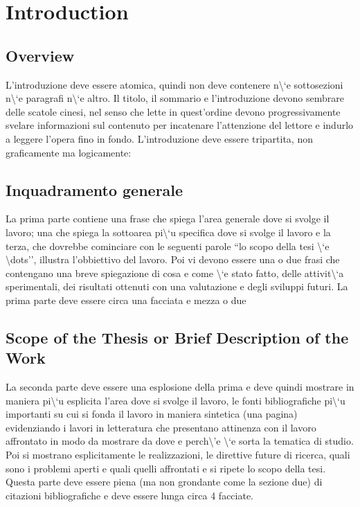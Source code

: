 
\chapter{Introduction}


\section{Overview}

L'introduzione deve essere atomica, quindi non deve contenere n\textbackslash{}`e
sottosezioni n\textbackslash{}`e paragrafi n\textbackslash{}`e altro.
Il titolo, il sommario e l'introduzione devono sembrare delle scatole
cinesi, nel senso che lette in quest'ordine devono progressivamente
svelare informazioni sul contenuto per incatenare l'attenzione del
lettore e indurlo a leggere l'opera fino in fondo. L'introduzione
deve essere tripartita, non graficamente ma logicamente:


\section{Inquadramento generale}

La prima parte contiene una frase che spiega l'area generale dove
si svolge il lavoro; una che spiega la sottoarea pi\textbackslash{}`u
specifica dove si svolge il lavoro e la terza, che dovrebbe cominciare
con le seguenti parole ``lo scopo della tesi \textbackslash{}`e \textbackslash{}dots'',
illustra l'obbiettivo del lavoro. Poi vi devono essere una o due frasi
che contengano una breve spiegazione di cosa e come \textbackslash{}`e
stato fatto, delle attivit\textbackslash{}`a sperimentali, dei risultati
ottenuti con una valutazione e degli sviluppi futuri. La prima parte
deve essere circa una facciata e mezza o due


\section{Scope of the Thesis or Brief Description of the Work}

La seconda parte deve essere una esplosione della prima e deve quindi
mostrare in maniera pi\textbackslash{}`u esplicita l'area dove si
svolge il lavoro, le fonti bibliografiche pi\textbackslash{}`u importanti
su cui si fonda il lavoro in maniera sintetica (una pagina) evidenziando
i lavori in letteratura che presentano attinenza con il lavoro affrontato
in modo da mostrare da dove e perch\textbackslash{}'e \textbackslash{}`e
sorta la tematica di studio. Poi si mostrano esplicitamente le realizzazioni,
le direttive future di ricerca, quali sono i problemi aperti e quali
quelli affrontati e si ripete lo scopo della tesi. Questa parte deve
essere piena (ma non grondante come la sezione due) di citazioni bibliografiche
e deve essere lunga circa 4 facciate.


